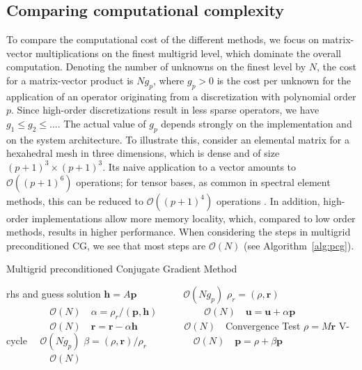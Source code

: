 \documentclass[smallcondensed,final]{svjour3}     %
\newcommand{\bs}[1]{\ensuremath{\boldsymbol #1}}
\begin{document}
\subsection{Comparing computational complexity}
To compare the computational cost of the different methods, we focus
on matrix-vector multiplications on the finest multigrid level, which
dominate the overall computation. Denoting the number of unknowns on
the finest level by $N$, the cost for a matrix-vector product is
$Ng_p$, where $g_p>0$ is the cost per unknown for the application of
an operator originating from a discretization with polynomial order
$p$. Since high-order discretizations result in less sparse operators,
we have $g_1\le g_2\le \ldots$. The actual value of $g_p$ depends
strongly on the implementation and on the system architecture. To
illustrate this, consider an elemental matrix for a hexahedral mesh in
three dimensions, which is dense and of size $(p+1)^3\times
(p+1)^3$. Its naive application to a vector amounts to $\mathcal
O((p+1)^6)$ operations; for tensor bases, as common in spectral
element methods, this can be reduced to $\mathcal O((p+1)^4)$
operations \cite{DevilleFischerMund02}. In addition, high-order
implementations allow more memory locality, which, compared to low
order methods, results in higher performance. When considering 
the steps in multigrid preconditioned CG, we see that most steps
are $\mathcal{O}(N)$ (see Algorithm~\ref{alg:pcg}). 


\begin{algorithm}[ht] 
  \caption{Multigrid preconditioned Conjugate Gradient Method} \label{alg:pcg} 
  \begin{algorithmic}[1]
    \Require rhs and guess
    \Ensure  solution
    \State $\bs{h} = A \bs{p}$ 											\Comment $~~\quad\quad\quad\quad\mathcal{O}(Ng_p)$
    \State $\rho_r = (\rho, \bs{r})$								\Comment $~~\quad\quad\quad\quad\mathcal{O}(N)~~~$
    \State $\alpha = \rho_r / ( \bs{p}, \bs{h} )$		\Comment $~~\quad\quad\quad\quad\mathcal{O}(N)~~~$
    \State $\bs{u} = \bs{u} + \alpha\bs{p}$					\Comment $~~\quad\quad\quad\quad\mathcal{O}(N)~~~$
    \State $\bs{r} = \bs{r} - \alpha\bs{h}$					\Comment $~~\quad\quad\quad\quad\mathcal{O}(N)~~~$
    \State Convergence Test
    \State $\rho = M\bs{r}$ 												\Comment V-cycle $\quad\mathcal{O}(Ng_p)$
    \State $\beta = (\rho, \bs{r}) / \rho_r$				\Comment $~~\quad\quad\quad\quad\mathcal{O}(N)~~~$
    \State $\bs{p} = \rho + \beta\bs{p}$						\Comment $~~\quad\quad\quad\quad\mathcal{O}(N)~~~$
    \EndWhile
  \end{algorithmic}
\end{algorithm}
\end{document}
